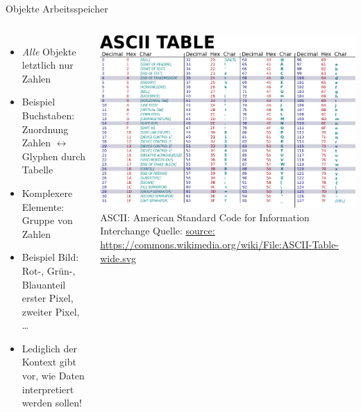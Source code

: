 
\begin{frame}[fragile]{Objekte Arbeitsspeicher}
%
\begin{columns}
	\begin{itemize}
	\item \emph{Alle} Objekte letztlich nur Zahlen
	\item Beispiel Buchstaben: Zuordnung \newline 
		Zahlen $\leftrightarrow$ Glyphen durch Tabelle
	\item Komplexere Elemente: Gruppe von Zahlen
	\item Beispiel Bild: Rot-, Grün-, Blauanteil erster Pixel, zweiter Pixel, \ldots
	\item Lediglich der Kontext gibt vor, wie Daten interpretiert werden sollen!
	\end{itemize}
	\includegraphics[width=\linewidth]{./gfx/ASCII_table}\newline
	\tiny ASCII: American Standard Code for Information Interchange\newline
	Quelle: \url{source: https://commons.wikimedia.org/wiki/File:ASCII-Table-wide.svg}
\end{columns}
%
\end{frame}


